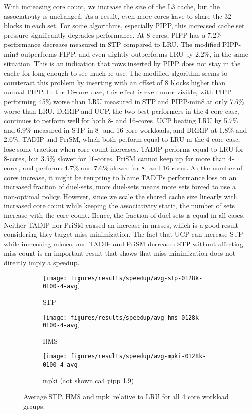 With increasing core count, we increase the size of the L3 cache, but the associativity is unchanged.
As a result, even more cores have to share the 32 blocks in each set.
For some algorithms, especially PIPP, this increased cache set pressure significantly degrades performance.
At 8-cores, PIPP has a 7.2\% performance decrease measured in STP compared to LRU.
The modified PIPP-min8 outperforms PIPP, and even slightly outperforms LRU by 2.2\%, in the same situation.
This is an indication that rows inserted by PIPP does not stay in the cache for long enough to see much re-use.
The modified algorithm seems to counteract this problem by inserting with an offset of 8 blocks higher than normal PIPP.
In the 16-core case, this effect is even more visible, with PIPP performing 45\% worse than LRU measured in STP and PIPP-min8 at only 7.6\% worse than LRU.
DRRIP and UCP, the two best performers in the 4-core case, continues to perform well for both 8- and 16-cores.
UCP beating LRU by 5.7\% and 6.9\% measured in STP in 8- and 16-core workloads, and DRRIP at 1.8\% and 2.6\%.
TADIP and PriSM, which both perform equal to LRU in the 4-core case, lose some traction when core count increases.
TADIP performs equal to LRU for 8-cores, but 3.6\% slower for 16-cores.
PriSM cannot keep up for more than 4-cores, and performs 4.7\% and 7.6\% slower for 8- and 16-cores.
As the number of cores increase, it might be tempting to blame TADIPs performance loss on an increased fraction of duel-sets, more duel-sets means more sets forced to use a non-optimal policy.
However, since we scale the shared cache size linearly with increased core count while keeping the associativity static, the number of sets increase with the core count.
Hence, the fraction of duel sets is equal in all cases.
Neither TADIP nor PriSM caused an increase in misses, which is a good result considering they target miss-minimization.
The fact that UCP can increase STP while increasing misses, and TADIP and PriSM decreases STP without affecting miss count is an important result that shows that miss minimization does not directly imply a speedup.

\begin{figure}[!htb]
    \centering
    \begin{subfigure}[b]{0.6\textwidth}
        \texttt{[image: figures/results/speedup/avg-stp-0128k-0100-4-avg]}
        \caption{STP}
        \label{fig:results:base:4-avg:stp}
    \end{subfigure}
    \begin{subfigure}[b]{0.6\textwidth}
        \texttt{[image: figures/results/speedup/avg-hms-0128k-0100-4-avg]}
        \caption{HMS}
        \label{fig:results:base:4-avg:hms}
    \end{subfigure}
    \begin{subfigure}[b]{0.6\textwidth}
        \texttt{[image: figures/results/speedup/avg-mpki-0128k-0100-4-avg]}
        \caption{mpki (not shown ca4 pipp 1.9)}
        \label{fig:results:base:4-avg:mpki}
    \end{subfigure}
    \caption{Average STP, HMS and mpki relative to LRU for all 4 core workload groups.}
    \label{fig:results:base:4-avg} 
\end{figure}

